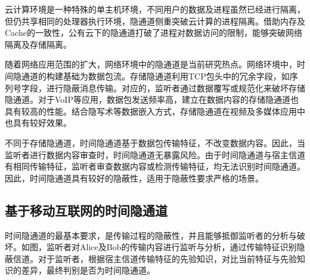 云计算环境是一种特殊的单主机环境，不同用户的数据及进程虽然已经进行隔离，但仍共享相同的处理器执行环境，隐通道侧重突破云计算的进程隔离。借助内存及Cache的一致性，公有云下的隐通道打破了进程对数据访问的限制，能够突破网络隔离及存储隔离。

随着网络应用范围的扩大，网络环境中的隐通道是当前研究热点。网络环境中，时间隐通道的构建基础为数据包流。存储隐通道利用TCP包头中的冗余字段，如序列号字段，进行隐蔽消息传输。对应的，监听者通过数据覆写或规范化来破坏存储隐通道。对于VoIP等应用，数据包发送频率高，建立在数据内容的存储隐通道也具有较高的性能。结合隐写术等数据嵌入方式，存储隐通道在视频及多媒体应用中也具有较好效果。

不同于存储隐通道，时间隐通道基于数据包传输特征，不改变数据内容。因此，当监听者进行数据内容审查时，时间隐通道无暴露风险。由于时间隐通道与宿主信道有相同传输特征，监听者审查数据内容或检测传输特征，均无法识别时间隐通道。因此，时间隐通道具有较好的隐蔽性，适用于隐蔽性要求严格的场景。

\subsection{基于移动互联网的时间隐通道}
\label{sec:intro:background:ctc}

时间隐通道的最基本要求，是传输过程的隐蔽性，并且能够抵御监听者的分析与破坏。如图，监听者对Alice及Bob的传输内容进行监听与分析，通过传输特征识别隐蔽信道。对于监听者，根据宿主信道传输特征的先验知识，对比当前特征与先验知识的差异，最终判别是否为时间隐通道。


